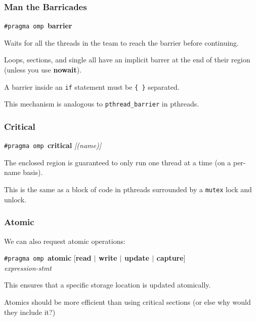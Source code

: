 \begin{frame}
\frametitle{Man the Barricades}


  \begin{center}
    {\tt \#pragma omp }{\bf barrier}
  \end{center}

     Waits for all the threads in the team to reach the barrier before
      continuing.
      
     Loops, sections, and single all have an implicit barrer at the end of their
      region (unless you use {\bf nowait}).
      
      
     A barrier inside an {\tt if} statement must be {\tt \{  \}} separated.

     This mechanism is analogous to {\tt pthread\_barrier} in pthreads.


\end{frame}


\begin{frame}
\frametitle{Critical}

 \begin{center}
    {\tt \#pragma omp }{\bf critical} {\it [(name)]}
  \end{center}

    The enclosed region is guaranteed to only run one thread at a time
      (on a per-name basis).
    
    This is the same as a block of code in pthreads surrounded by a {\tt mutex} lock
      and unlock.

\end{frame}


\begin{frame}
\frametitle{Atomic}

We can also request atomic operations:

    {\tt \#pragma omp }{\bf atomic} [{\bf read $\mid$ write $\mid$ update $\mid$ capture}]\\
    {\it expression-stmt}
    
This ensures that a specific storage location is updated
    atomically.  
    
    Atomics should be more efficient than using critical
    sections (or else why would they include it?)


\end{frame}



